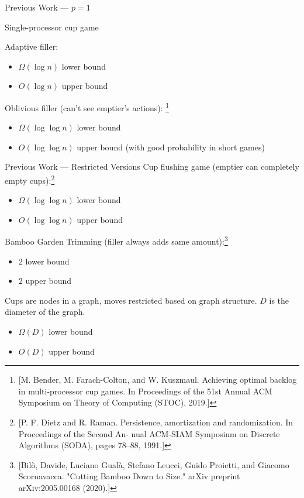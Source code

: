 \documentclass[xcolor=x11names, svgnames, rgb]{beamer}
\begin{document}
\begin{frame}[t]{Previous Work --- $p=1$}

  Single-processor cup game

  Adaptive filler:
  \begin{itemize}
    \item $\Omega(\log n)$ lower bound
    \item $O(\log n)$ upper bound
  \end{itemize}

  Oblivious filler (can't see emptier's actions):
  \footnote{[M. Bender, M. Farach-Colton, and W. Kuszmaul. Achieving optimal backlog in multi-processor cup games. In Proceedings of the 51st Annual ACM Symposium on Theory of Computing (STOC), 2019.]}
  \begin{itemize}
    \item $\Omega(\log\log n)$ lower bound
    \item $O(\log\log n)$ upper bound (with good probability in short games)
  \end{itemize}
\end{frame}

\begin{frame}[t]{Previous Work --- Restricted Versions}
  Cup flushing game (emptier can completely empty cups):\footnote{[P. F. Dietz and R. Raman. Persistence, amortization and randomization. In Proceedings of the Second An- nual ACM-SIAM Symposium on Discrete Algorithms (SODA), pages 78–88, 1991.]}
\begin{itemize}
  \item $\Omega(\log \log n)$ lower bound
  \item $O(\log \log n)$ upper bound
\end{itemize}

Bamboo Garden Trimming (filler always adds same amount):\footnote{[Bilò, Davide, Luciano Gualà, Stefano Leucci, Guido Proietti, and Giacomo Scornavacca. "Cutting Bamboo Down to Size." arXiv preprint arXiv:2005.00168 (2020).]}
\begin{itemize}
  \item $2$ lower bound
  \item $2$ upper bound
\end{itemize}

Cups are nodes in a graph, moves restricted based on graph structure. $D$ is the diameter of the graph.
\begin{itemize}
  \item $\Omega(D)$ lower bound
  \item $O(D)$ upper bound
\end{itemize}
\end{frame}
\end{document}
